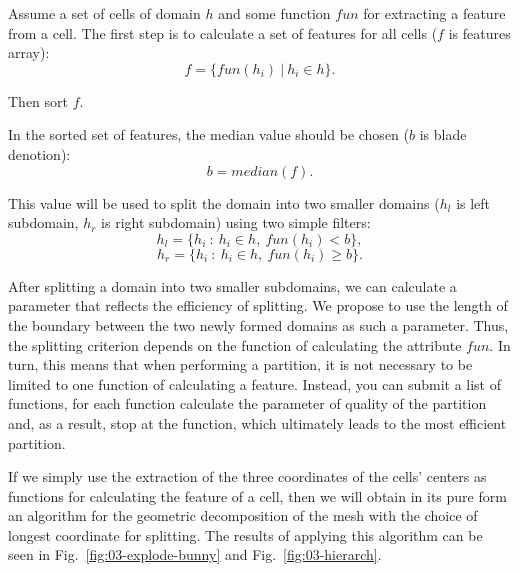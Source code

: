 \documentclass[
11pt,%
tightenlines,%
twoside,%
onecolumn,%
nofloats,%
nobibnotes,%
nofootinbib,%
superscriptaddress,%
noshowpacs,%
centertags]%
{revtex4}
\begin{document}
Assume a set of cells of domain $h$ and some function $fun$ for extracting a feature from a cell.
The first step is to calculate a set of features for all cells ($f$ is features array):
\begin{equation*}
	f = \{fun(h_i)~|~h_i \in h\}.
\end{equation*}

Then sort $f$.

In the sorted set of features, the median value should be chosen ($b$ is blade denotion):
\begin{equation*}
	b = median(f).
\end{equation*}

This value will be used to split the domain into two smaller domains ($h_l$ is left subdomain, $h_r$ is right subdomain) using two simple filters:
\begin{equation*}
	h_l = \{h_i~:~h_i \in h,~fun(h_i) < b\},
\end{equation*}
\begin{equation*}
	h_r = \{h_i~:~h_i \in h,~fun(h_i) \geq b\}.
\end{equation*}

After splitting a domain into two smaller subdomains, we can calculate a parameter that reflects the efficiency of splitting.
We propose to use the length of the boundary between the two newly formed domains as such a parameter.
Thus, the splitting criterion depends on the function of calculating the attribute $fun$.
In turn, this means that when performing a partition, it is not necessary to be limited to one function of calculating a feature.
Instead, you can submit a list of functions, for each function calculate the parameter of quality of the partition and, as a result, stop at the function, which ultimately leads to the most efficient partition.

If we simply use the extraction of the three coordinates of the cells' centers as functions for calculating the feature of a cell, then we will obtain in its pure form an algorithm for the geometric decomposition of the mesh with the choice of longest coordinate for splitting.
The results of applying this algorithm can be seen in Fig.~\ref{fig:03-explode-bunny} and Fig.~\ref{fig:03-hierarch}.
\end{document}
